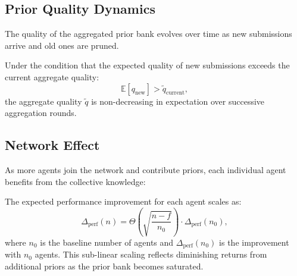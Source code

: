\subsection{Prior Quality Dynamics}

The quality of the aggregated prior bank evolves over time as new submissions
arrive and old ones are pruned.

\begin{proposition}
Under the condition that the expected quality of new submissions exceeds the
current aggregate quality:
\begin{equation}
    \mathbb{E}[q_{\text{new}}] > \tilde{q}_{\text{current}},
\end{equation}
the aggregate quality $\tilde{q}$ is non-decreasing in expectation over
successive aggregation rounds.
\end{proposition}

\subsection{Network Effect}

As more agents join the network and contribute priors, each individual agent
benefits from the collective knowledge:

\begin{corollary}
The expected performance improvement for each agent scales as:
\begin{equation}
    \Delta_{\text{perf}}(n) = \Theta\left(\sqrt{\frac{n-f}{n_0}}\right) \cdot \Delta_{\text{perf}}(n_0),
\end{equation}
where $n_0$ is the baseline number of agents and $\Delta_{\text{perf}}(n_0)$ is
the improvement with $n_0$ agents. This sub-linear scaling reflects diminishing
returns from additional priors as the prior bank becomes saturated.
\end{corollary}

